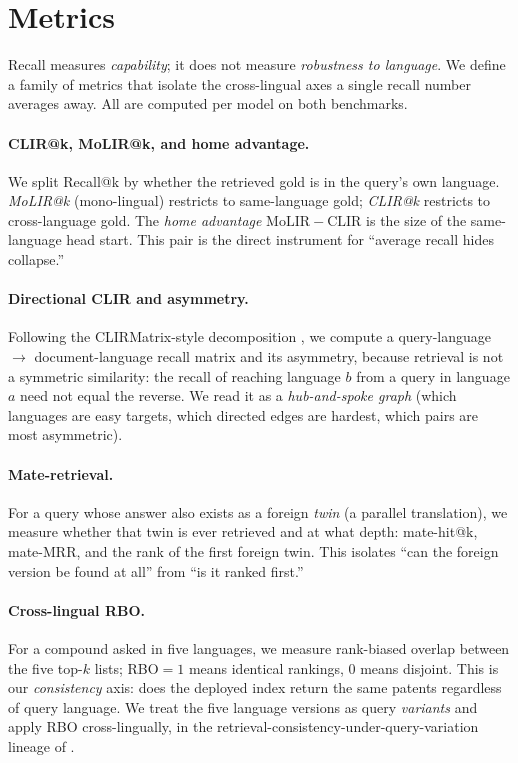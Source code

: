 \documentclass[11pt]{article}
\begin{document}
\section{Metrics}
\label{sec:metrics}

Recall measures \emph{capability}; it does not measure \emph{robustness to
language}. We define a family of metrics that isolate the cross-lingual axes a
single recall number averages away. All are computed per model on both
benchmarks.

\paragraph{CLIR@k, MoLIR@k, and home advantage.}
We split Recall@k by whether the retrieved gold is in the query's own language.
\emph{MoLIR@k} (mono-lingual) restricts to same-language gold; \emph{CLIR@k}
restricts to cross-language gold. The \emph{home advantage}
$\mathrm{MoLIR}{-}\mathrm{CLIR}$ is the size of the same-language head start.
This pair is the direct instrument for ``average recall hides collapse.''

\paragraph{Directional CLIR and asymmetry.}
Following the CLIRMatrix-style decomposition \citep{clirmatrix2020}, we compute a
query-language $\rightarrow$ document-language recall matrix and its asymmetry,
because retrieval is not a symmetric similarity: the recall of reaching language
$b$ from a query in language $a$ need not equal the reverse. We read it as a
\emph{hub-and-spoke graph} (which languages are easy targets, which directed
edges are hardest, which pairs are most asymmetric).

\paragraph{Mate-retrieval.}
For a query whose answer also exists as a foreign \emph{twin} (a parallel
translation), we measure whether that twin is ever retrieved and at what depth:
mate-hit@k, mate-MRR, and the rank of the first foreign twin. This isolates
``can the foreign version be found at all'' from ``is it ranked first.''

\paragraph{Cross-lingual RBO.}
For a compound asked in five languages, we measure rank-biased overlap
\citep{rbo2010} between the five top-$k$ lists; RBO$=1$ means identical
rankings, $0$ means disjoint. This is our \emph{consistency} axis: does the
deployed index return the same patents regardless of query language. We treat
the five language versions as query \emph{variants} and apply RBO
cross-lingually, in the retrieval-consistency-under-query-variation lineage of
\citet{bailey2017consistency}.
\end{document}
